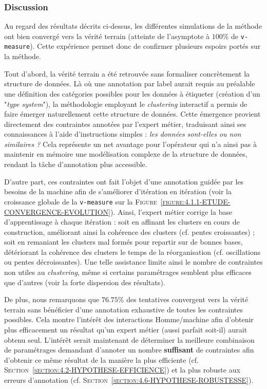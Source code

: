 		\subsubsection{Discussion}
			
			Au regard des résultats décrits ci-dessus, les différentes simulations de la méthode ont bien convergé vers la vérité terrain (atteinte de l'asymptote à $100$\% de \texttt{v-measure}).
			Cette expérience permet donc de confirmer plusieurs espoirs portés sur la méthode.
			
			Tout d'abord, la vérité terrain a été retrouvée sans formaliser concrètement la structure de données.
			Là où une annotation par label aurait requis au préalable une définition des catégories possibles pour les données à étiqueter (création d'un "\textit{type system}"), la méthodologie employant le \textit{clustering} interactif a permis de faire émerger naturellement cette structure de données.
			Cette émergence provient directement des contraintes annotées par l'expert métier, traduisant ainsi ses connaissances à l'aide d'instructions simples : \textit{les données sont-elles ou non similaires ?}
			Cela représente un net avantage pour l'opérateur qui n'a ainsi pas à maintenir en mémoire une modélisation complexe de la structure de données, rendant la tâche d'annotation plus accessible.
			
			D'autre part, ces contraintes ont fait l'objet d'une annotation guidée par les besoins de la machine afin de s'améliorer d'itération en itération (voir la croissance globale de la \texttt{v-measure} sur la \textsc{Figure~\ref{figure:4.1.1-ETUDE-CONVERGENCE-EVOLUTION}}).
			Ainsi, l'expert métier corrige la base d'apprentissage à chaque itération : soit en affinant les clusters en cours de construction, améliorant ainsi la cohérence des clusters (cf. pentes croissantes) ; soit en remaniant les clusters mal formés pour repartir sur de bonnes bases, détériorant la cohérence des clusters le temps de la réorganisation (cf. oscillations ou pentes décroissantes).
			Une telle assistance limite ainsi le nombre de contraintes non utiles au \textit{clustering}, même si certains paramétrages semblent plus efficaces que d'autres (voir la forte dispersion des résultats).
			
			De plus, nous remarquons que $76.75$\% des tentatives convergent vers la vérité terrain sans bénéficier d'une annotation exhaustive de toutes les contraintes possibles.
			Cela montre l'intérêt des interactions Homme/machine afin d'obtenir plus efficacement un résultat qu'un expert métier (aussi parfait soit-il) aurait obtenu seul. 
			L'intérêt serait maintenant de déterminer la meilleure combinaison de paramétrages demandant d'annoter un nombre \textbf{suffisant} de contraintes afin d'obtenir ce même résultat de la manière la plus efficiente (cf. \textsc{Section~\ref{section:4.2-HYPOTHESE-EFFICIENCE}}) et la plus robuste aux erreurs d'annotation (cf. \textsc{Section~\ref{section:4.6-HYPOTHESE-ROBUSTESSE}}).
			\\

